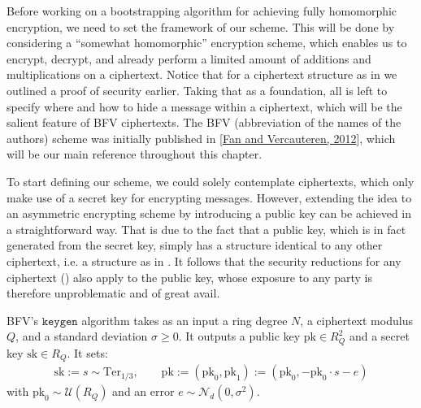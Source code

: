 \documentclass[letterpaper,10pt,english]{jupyterBook}
\begin{document}
\sphinxAtStartPar
Before working on a bootstrapping algorithm for achieving fully homomorphic encryption, we need to set the framework of our scheme.
This will be done by considering a “somewhat homomorphic” encryption scheme, which enables us to encrypt, decrypt, and already perform a limited amount of additions and multiplications on a ciphertext.
Notice that for a ciphertext structure as in {\hyperref[\detokenize{Thesis:RLWE-distribution}]{}} we outlined a proof of security earlier.
Taking that as a foundation, all is left to specify where and how to hide a message within a ciphertext, which will be the salient feature of BFV ciphertexts.
The BFV (abbreviation of the names of the authors) scheme was initially published in {[}\hyperlink{cite.Thesis:id70}{Fan and Vercauteren, 2012}{]}, which will be our main reference throughout this chapter.

\begin{DUlineblock}{0em}
\item[] 
\end{DUlineblock}

\sphinxAtStartPar
To start defining our scheme, we could solely contemplate ciphertexts, which only make use of a secret key for encrypting messages.
However, extending the idea to an asymmetric encrypting scheme by introducing a public key can be achieved in a straightforward way.
That is due to the fact that a public key, which is in fact generated from the secret key, simply has a structure identical to any other ciphertext, i.e. a structure as in {\hyperref[\detokenize{Thesis:RLWE-distribution}]{}}.
It follows that the security reductions for any ciphertext ({\hyperref[\detokenize{Thesis:RLWE-security}]{}}) also apply to the public key, whose exposure to any party is therefore unproblematic and of great avail.

\sphinxAtStartPar
BFV’s \(\texttt{keygen}\) algorithm takes as an input a ring degree \(N\), a ciphertext modulus \(Q\), and a standard deviation \(\sigma \ge 0\).
It outputs a public key \(\mathrm{pk} \in R_Q^2\) and a secret key \(\mathrm{sk} \in R_Q\). It sets:
\begin{equation*}
\begin{split}\mathrm{sk} := s \sim \mathrm{Ter}_{1/3}, \qquad
\mathrm{pk} := (\mathrm{pk}_0, \mathrm{pk}_1) := (\mathrm{pk}_0,-\mathrm{pk}_0\cdot s-e)\end{split}
\end{equation*}
\sphinxAtStartPar
with \(\mathrm{pk}_0 \sim \mathcal U(R_Q)\) and an error \(e \sim \mathcal N_d(0,\sigma^2)\).
\end{document}
